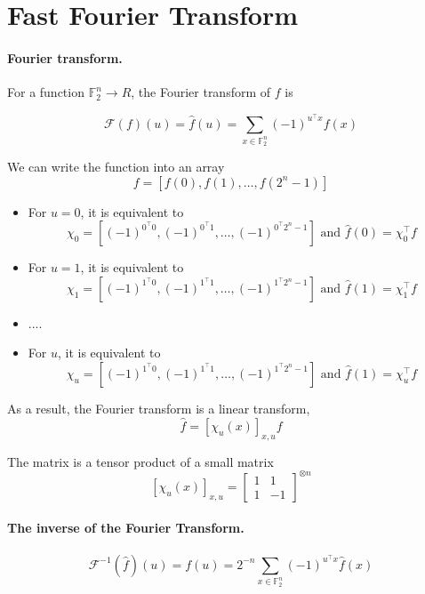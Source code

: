 \documentclass[12pt,journal=tosc, notanonymous]{iacrtrans}
\begin{document}
\section{Fast Fourier Transform}

\paragraph{Fourier transform.}

For a function $\mathbb{F}_2^n \rightarrow R$, the Fourier transform of $f$ 
is 

$$
\mathcal{F}(f)(u) = \hat{f}(u) = \sum_{x\in \mathbb{F}_2^n} (-1)^{u^\top x} f(x) 
$$  


We can write the function into an array 
$$
f = [f(0), f(1), \ldots, f(2^n-1)]
$$

\begin{itemize}
    \item For $u = 0$, it is equivalent to 
    $$
    \chi_0 = [(-1)^{0^\top 0}, (-1)^{0^\top 1}, \ldots, (-1)^{0^\top 2^{n}-1}] \mbox{ and } 
    \hat{f}(0) = \chi_0^\top f 
    $$
    \item For $u = 1$, it is equivalent to 
    $$
    \chi_1 = [(-1)^{1^\top 0}, (-1)^{1^\top 1}, \ldots, (-1)^{1^\top 2^{n}-1}] \mbox{ and } 
    \hat{f}(1) = \chi_1^\top f 
    $$ 
    \item .... 
    \item For $u$, it is equivalent to 
    $$
    \chi_u = [(-1)^{1^\top 0}, (-1)^{1^\top 1}, \ldots, (-1)^{1^\top 2^{n}-1}] \mbox{ and } 
    \hat{f}(1) = \chi_u^\top f 
    $$ 
    \end{itemize}

As a result, the Fourier transform is a linear transform, 
$$
\hat{f} = [\chi_u(x)]_{x, u} f 
$$

The matrix is a tensor product of a small matrix 
$$
[\chi_u(x)]_{x, u} = 
\begin{bmatrix}
1 & 1 \\
1 & -1
\end{bmatrix}^{\otimes n}
$$


\vspace{2em}
\paragraph{
The inverse of the Fourier Transform.} 

$$
\mathcal{F}^{-1}(\hat{f})(u) = f(u) = 2^{-n} \sum_{x\in \mathbb{F}_2^n} (-1)^{u^\top x} \hat{f}(x) 
$$  
\end{document}
